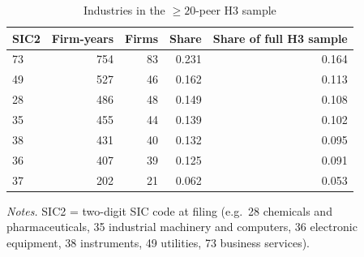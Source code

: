 \begin{table}[htbp]
\centering
\caption{Industries in the $\geq 20$-peer H3 sample}
\label{tab:h3_cells}
\small
\begin{tabular}{lrrrr}
\toprule
SIC2 & Firm-years & Firms & Share & Share of full H3 sample \\
\midrule
73 & 754 & 83 & 0.231 & 0.164 \\
49 & 527 & 46 & 0.162 & 0.113 \\
28 & 486 & 48 & 0.149 & 0.108 \\
35 & 455 & 44 & 0.139 & 0.102 \\
38 & 431 & 40 & 0.132 & 0.095 \\
36 & 407 & 39 & 0.125 & 0.091 \\
37 & 202 & 21 & 0.062 & 0.053 \\
\bottomrule
\end{tabular}
\par\smallskip
\begin{minipage}{\linewidth}\footnotesize
\emph{Notes.} SIC2 = two-digit SIC code at filing (e.g.\ 28 chemicals and pharmaceuticals, 35 industrial machinery and computers, 36 electronic equipment, 38 instruments, 49 utilities, 73 business services).
\end{minipage}
\end{table}
